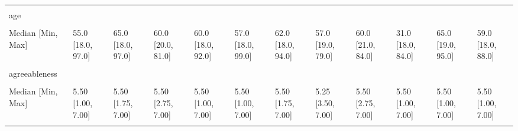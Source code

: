 \documentclass[
  single column]{article}
\begin{document}
\begin{landscape}
\begin{longtable}[t]{llllllllllll}
\endfoot
\bottomrule
\endlastfoot
\cellcolor{gray!10}{} & \cellcolor{gray!10}{(N=21551)} & \cellcolor{gray!10}{(N=1363)} & \cellcolor{gray!10}{(N=270)} & \cellcolor{gray!10}{(N=2017)} & \cellcolor{gray!10}{(N=3696)} & \cellcolor{gray!10}{(N=1095)} & \cellcolor{gray!10}{(N=136)} & \cellcolor{gray!10}{(N=87)} & \cellcolor{gray!10}{(N=658)} & \cellcolor{gray!10}{(N=576)} & \cellcolor{gray!10}{(N=744)}\\
age &  &  &  &  &  &  &  &  &  &  & \\
\cellcolor{gray!10}{Mean (SD)} & \cellcolor{gray!10}{51.6 (16.8)} & \cellcolor{gray!10}{63.3 (12.2)} & \cellcolor{gray!10}{56.2 (14.2)} & \cellcolor{gray!10}{56.4 (15.1)} & \cellcolor{gray!10}{53.0 (16.6)} & \cellcolor{gray!10}{59.1 (14.4)} & \cellcolor{gray!10}{52.0 (17.5)} & \cellcolor{gray!10}{54.7 (16.3)} & \cellcolor{gray!10}{33.8 (12.6)} & \cellcolor{gray!10}{64.1 (11.5)} & \cellcolor{gray!10}{54.2 (16.7)}\\
Median [Min, Max] & 55.0 [18.0, 97.0] & 65.0 [18.0, 97.0] & 60.0 [20.0, 81.0] & 60.0 [18.0, 92.0] & 57.0 [18.0, 99.0] & 62.0 [18.0, 94.0] & 57.0 [19.0, 79.0] & 60.0 [21.0, 84.0] & 31.0 [18.0, 84.0] & 65.0 [19.0, 95.0] & 59.0 [18.0, 88.0]\\
\cellcolor{gray!10}{Missing} & \cellcolor{gray!10}{0 (0\%)} & \cellcolor{gray!10}{0 (0\%)} & \cellcolor{gray!10}{0 (0\%)} & \cellcolor{gray!10}{0 (0\%)} & \cellcolor{gray!10}{1 (0.0\%)} & \cellcolor{gray!10}{0 (0\%)} & \cellcolor{gray!10}{0 (0\%)} & \cellcolor{gray!10}{0 (0\%)} & \cellcolor{gray!10}{21 (3.2\%)} & \cellcolor{gray!10}{0 (0\%)} & \cellcolor{gray!10}{0 (0\%)}\\
\addlinespace
agreeableness &  &  &  &  &  &  &  &  &  &  & \\
\cellcolor{gray!10}{Mean (SD)} & \cellcolor{gray!10}{5.30 (1.03)} & \cellcolor{gray!10}{5.46 (0.952)} & \cellcolor{gray!10}{5.49 (0.932)} & \cellcolor{gray!10}{5.34 (1.00)} & \cellcolor{gray!10}{5.44 (1.00)} & \cellcolor{gray!10}{5.38 (1.01)} & \cellcolor{gray!10}{5.36 (0.871)} & \cellcolor{gray!10}{5.47 (0.984)} & \cellcolor{gray!10}{5.30 (1.05)} & \cellcolor{gray!10}{5.39 (0.950)} & \cellcolor{gray!10}{5.36 (1.03)}\\
Median [Min, Max] & 5.50 [1.00, 7.00] & 5.50 [1.75, 7.00] & 5.50 [2.75, 7.00] & 5.50 [1.00, 7.00] & 5.50 [1.00, 7.00] & 5.50 [1.75, 7.00] & 5.25 [3.50, 7.00] & 5.50 [2.75, 7.00] & 5.50 [1.00, 7.00] & 5.50 [1.00, 7.00] & 5.50 [1.00, 7.00]\\
\cellcolor{gray!10}{Missing} & \cellcolor{gray!10}{51 (0.2\%)} & \cellcolor{gray!10}{3 (0.2\%)} & \cellcolor{gray!10}{0 (0\%)} & \cellcolor{gray!10}{5 (0.2\%)} & \cellcolor{gray!10}{12 (0.3\%)} & \cellcolor{gray!10}{4 (0.4\%)} & \cellcolor{gray!10}{0 (0\%)} & \cellcolor{gray!10}{0 (0\%)} & \cellcolor{gray!10}{3 (0.5\%)} & \cellcolor{gray!10}{1 (0.2\%)} & \cellcolor{gray!10}{4 (0.5\%)}\\

\end{longtable}
\end{landscape}
\end{document}
